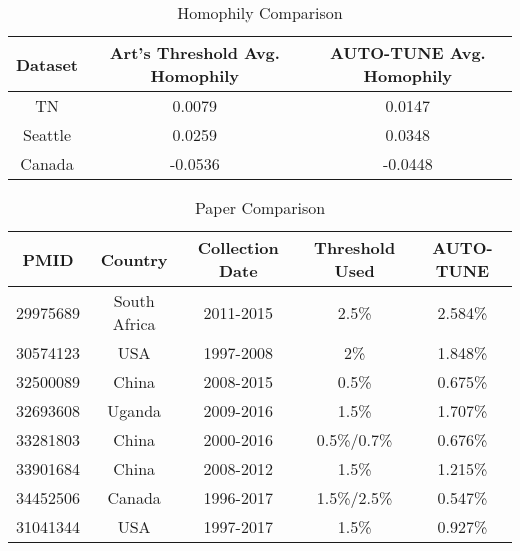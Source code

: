\documentclass[utf8]{FrontiersinHarvard} %
\begin{document}

\nocite{*}


\begin{table}[htbp]
\centering
\begin{tabular}{|c|c|c|}
\hline
Dataset & Art's Threshold Avg. Homophily & AUTO-TUNE Avg. Homophily \\
\hline
TN & 0.0079 & 0.0147 \\
Seattle & 0.0259 & 0.0348 \\
Canada & -0.0536 & -0.0448 \\
\hline
\end{tabular}
\caption{Homophily Comparison}
\label{tab:homophily}
\end{table}

\begin{table}[htbp]
\centering
\begin{tabular}{|c|c|c|c|c|}
\hline
PMID & Country & Collection Date & Threshold Used & AUTO-TUNE \\
\hline
29975689 & South Africa & 2011-2015 & 2.5\% & 2.584\% \\
30574123 & USA & 1997-2008 & 2\% & 1.848\% \\
32500089 & China & 2008-2015 & 0.5\% & 0.675\% \\
32693608 & Uganda & 2009-2016 & 1.5\% & 1.707\% \\
33281803 & China & 2000-2016 & 0.5\%/0.7\% & 0.676\% \\
33901684 & China & 2008-2012 & 1.5\% & 1.215\% \\
34452506 & Canada & 1996-2017 & 1.5\%/2.5\% & 0.547\% \\
31041344 & USA & 1997-2017 & 1.5\% & 0.927\% \\
\hline
\end{tabular}
\caption{Paper Comparison}
\label{tab:paperComparison}
\end{table}
\end{document}
